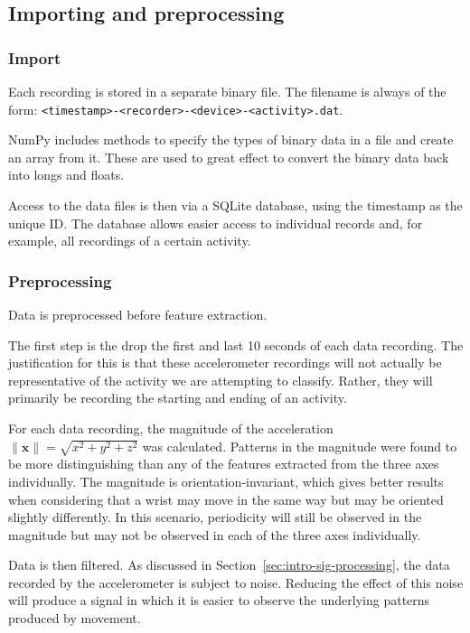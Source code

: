     \subsection{Importing and preprocessing}
      \subsubsection{Import}
        Each recording is stored in a separate binary file. The filename is always of the form: \texttt{<timestamp>-<recorder>-<device>-<activity>.dat}. 
        
        NumPy includes methods to specify the types of binary data in a file and create an array from it. These are used to great effect to convert the binary data back into longs and floats.
        
        Access to the data files is then via a SQLite database, using the timestamp as the unique ID. The database allows easier access to individual records and, for example, all recordings of a certain activity.
      \subsubsection{Preprocessing}
        \label{sec:preprocessing}
        Data is preprocessed before feature extraction.
        
        The first step is the drop the first and last 10 seconds of each data recording. The justification for this is that these accelerometer recordings will not actually be representative of the activity we are attempting to classify. Rather, they will primarily be recording the starting and ending of an activity.
        
        For each data recording, the magnitude of the acceleration $\|\mathbf{x}\| = \sqrt{x^2+y^2+z^2}$ was calculated. Patterns in the magnitude were found to be more distinguishing than any of the features extracted from the three axes individually. The magnitude is orientation-invariant, which gives better results when considering that a wrist may move in the same way but may be oriented slightly differently. In this scenario, periodicity will still be observed in the magnitude but may not be observed in each of the three axes individually.
        
        Data is then filtered. As discussed in Section~\ref{sec:intro-sig-processing}, the data recorded by the accelerometer is subject to noise. Reducing the effect of this noise will produce a signal in which it is easier to observe the underlying patterns produced by movement.
        
